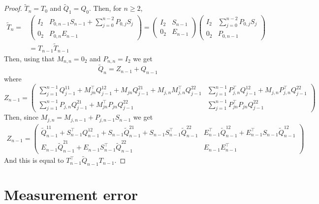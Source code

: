 \documentclass[aoas]{imsart}
\theoremstyle{definition}
\theoremstyle{remark}
\theoremstyle{remark}
\newcommand {\1}{\mathbb{1}}
\begin{document}
\begin{proof}
	$\tilde{T}_n=T_0$ and $\tilde{Q}_1=Q_0$. Then, for $n \geq 2$, 
	\begin{align*}
		\tilde{T}_{n}=&\begin{pmatrix} 
			I_2 & P_{0,n-1}S_{n-1}+\sum_{j=0}^{n-2} P_{0,j} S_j \\
			0_2 & P_{0,n} E_{n-1}
		\end{pmatrix}
	=\begin{pmatrix}
		I_2 & S_{n-1} \\
		0_2 & E_{n-1}
	\end{pmatrix}
	\begin{pmatrix} 
	I_2 & \sum_{j=0}^{n-2} P_{0,j} S_j \\
	0_2 & P_{0,n-1}
	\end{pmatrix}\\
	&= T_{n-1} \tilde{T}_{n-1}
	\end{align*}
Then, using that $M_{n,n}= 0_2 $ and $P_{n,n}=I_2$ we get
\[ \tilde{Q}_n=Z_{n-1}+Q_{n-1} \]
where 
\[Z_{n-1}=\begin{pmatrix} \sum_{j=1}^{n-1} Q_{j-1}^{11} +M_{jn}^\top Q_{j-1}^{12}+M_{jn} Q_{j-1}^{21}+M_{j,n}M_{j,n}^\top Q_{j-1}^{22} & \sum_{j=1}^{n-1}  P_{j,n}^\top Q_{j-1}^{12} +M_{j,n} P_{j,n}^\top Q_{j-1}^{22} \\
	\sum_{j=1}^{n-1} P_{j,n} Q_{j-1} ^{21} + M_{jn}^\top P_{jn} Q_{j-1}^{22} & \sum_{j=1}^{n-1} P_{jn}^\top P_{jn} Q_{j-1}^{22}
	\end{pmatrix}
\]
Then, since $M_{j,n}=M_{j,n-1}+P_{j,n-1} S_{n-1}$ we get
\begin{align*} Z_{n-1}=\begin{pmatrix} \tilde{Q}_{n-1}^{11}+S_{n-1}^\top Q_{n-1}^{12}+S_{n-1} \tilde{Q}_{n-1}^{21}+S_{n-1}S_{n-1}^\top \tilde{Q}_{n-1}^{22} &  E_{n-1}^\top \tilde{Q}_{n-1}^{12}+E_{n-1}^\top S_{n-1} \tilde{Q}_{n-1}^{12}\\
		E_{n-1} \tilde{Q}_{n-1}^{21}+E_{n-1} S_{n-1}^\top \tilde{Q}_{n-1}^{22} & E_{n-1}E_{n-1}^\top
	\end{pmatrix}
\end{align*}
And this is equal to $T_{n-1}^\top \tilde{Q}_{n-1} T_{n-1}$.
	
\end{proof}

\section{Measurement error}
\end{document}
